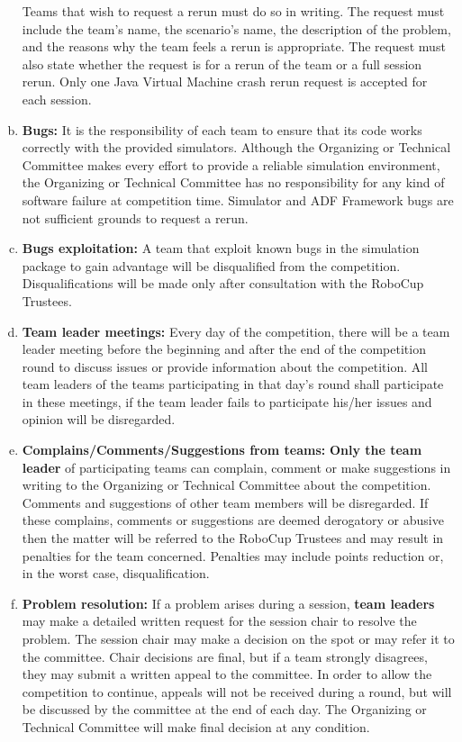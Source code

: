 \documentclass{article}
\begin{document}
\begin{enumerate}[(a)]
Teams that wish to request a rerun must do so in writing. The request must include the team's name, the scenario's name, the description of the problem, and the reasons why the team feels a rerun is appropriate. The request must also state whether the request is for a rerun of the team or a full session rerun. Only one Java Virtual Machine crash rerun request is accepted for each session.
\item \textbf{Bugs:} It is the responsibility of each team to ensure that its code works correctly with the provided simulators. Although the Organizing or Technical Committee makes every effort to provide a reliable simulation environment, the Organizing or Technical Committee has no responsibility for any kind of software failure at competition time. Simulator and ADF Framework bugs are not sufficient grounds to request a rerun.
\item \textbf{Bugs exploitation:} A team that exploit known bugs in the simulation package to gain advantage will be disqualified from the competition. Disqualifications will be made only after consultation with the RoboCup Trustees. \label{item:bug_exploitation}
\item \textbf{Team leader meetings:} Every day of the competition, there will be a team leader meeting before the beginning and after the end of the competition round to discuss issues or provide information about the competition. All team leaders of the teams participating in that day's round shall participate in these meetings, if the team leader fails to participate his/her issues and opinion will be disregarded.
\item \textbf{Complains/Comments/Suggestions from teams:} \textbf{Only the team leader} of participating teams can complain, comment or make suggestions in writing to the Organizing or Technical Committee about the competition. Comments and suggestions of other team members will be disregarded. If these complains, comments or suggestions are deemed derogatory or abusive then the matter will be referred to the RoboCup Trustees and may result in penalties for the team concerned. Penalties may include points reduction or, in the worst case, disqualification.
\item \textbf{Problem resolution:} If a problem arises during a session, \textbf{team leaders} may make a detailed written request for the session chair to resolve the problem. The session chair may make a decision on the spot or may refer it to the committee. Chair decisions are final, but if a team strongly disagrees, they may submit a written appeal to the committee. In order to allow the competition to continue, appeals will not be received during a round, but will be discussed by the committee at the end of each day. The Organizing or Technical Committee will make final decision at any condition.

\end{enumerate}
\end{document}
